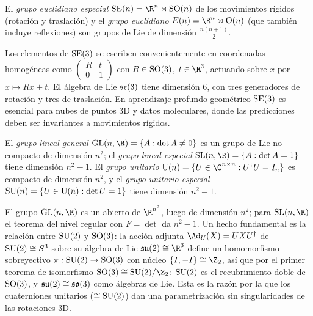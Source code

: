 \begin{definition}
\label{def:found:euclidean-groups}
El \emph{grupo euclidiano especial} $\SE(n) = \R^n \rtimes \SO(n)$ de los
movimientos r\'igidos (rotaci\'on y traslaci\'on) y el \emph{grupo euclidiano}
$E(n) = \R^n \rtimes \Orth(n)$ (que tambi\'en incluye reflexiones) son grupos de
Lie de dimensi\'on $\frac{n(n+1)}{2}$.
\end{definition}

Los elementos de $\operatorname{SE}(3)$ se escriben convenientemente en coordenadas homog\'eneas
como $\left(\begin{smallmatrix} R & t \\ 0 & 1\end{smallmatrix}\right)$ con $R \in
\operatorname{SO}(3)$, $t \in \R^3$, actuando sobre $x$ por $x \mapsto Rx + t$. El \'algebra de
Lie $\mathfrak{se}(3)$ tiene dimensi\'on $6$, con tres generadores de rotaci\'on y tres
de traslaci\'on. En aprendizaje profundo geom\'etrico $\operatorname{SE}(3)$ es esencial para
nubes de puntos 3D y datos moleculares, donde las predicciones deben ser invariantes
a movimientos r\'igidos.

\begin{definition}
\label{def:found:linear-unitary}
El \emph{grupo lineal general} $\GL(n,\R) = \{A : \det A \ne 0\}$ es un grupo de Lie
no compacto de dimensi\'on $n^2$; el \emph{grupo lineal especial} $\SL(n,\R) = \{A
: \det A = 1\}$ tiene dimensi\'on $n^2 - 1$. El \emph{grupo unitario} $\U(n) = \{U
\in \C^{n\times n} : U^\dagger U = I_n\}$ es compacto de dimensi\'on $n^2$, y el
\emph{grupo unitario especial} $\operatorname{SU}(n) = \{U \in \operatorname{U}(n) : \det U = 1\}$ tiene
dimensi\'on $n^2 - 1$.
\end{definition}

El grupo $\GL(n,\R)$ es un abierto de $\R^{n^2}$, luego de dimensi\'on $n^2$; para
$\SL(n,\R)$ el teorema del nivel regular con $F = \det$ da $n^2 - 1$. Un hecho
fundamental es la relaci\'on entre $\operatorname{SU}(2)$ y $\operatorname{SO}(3)$: la acci\'on adjunta
$\Ad_U(X) = UXU^\dagger$ de $\operatorname{SU}(2) \cong S^3$ sobre su \'algebra de Lie
$\Lie{su}(2) \cong \R^3$ define un homomorfismo sobreyectivo $\pi : \operatorname{SU}(2) \to
\operatorname{SO}(3)$ con n\'ucleo $\{I, -I\} \cong \Z_2$, as\'i que por el primer teorema de
isomorfismo $\SO(3) \cong \SU(2)/\Z_2$: $\operatorname{SU}(2)$ es el recubrimiento doble de
$\operatorname{SO}(3)$, y $\mathfrak{su}(2) \cong \mathfrak{so}(3)$ como \'algebras de Lie. Esta es la
raz\'on por la que los cuaterniones unitarios ($\cong \operatorname{SU}(2)$) dan una
parametrizaci\'on sin singularidades de las rotaciones 3D.

